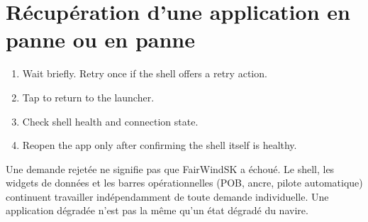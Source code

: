 \section{Récupération d'une application en panne ou en panne}

\begin{enumerate}
  \item Wait briefly. Retry once if the shell offers a retry action.
  \item Tap  to return to the launcher.
  \item Check shell health and connection state.
  \item Reopen the app only after confirming the shell itself is healthy.
\end{enumerate}

\begin{tipbox}
Une demande rejetée ne signifie pas que FairWindSK a échoué.
Le shell, les widgets de données et les barres opérationnelles (POB, ancre, pilote automatique) continuent
travailler indépendamment de toute demande individuelle.
Une application dégradée n'est pas la même qu'un état dégradé du navire.
\end{tipbox}
